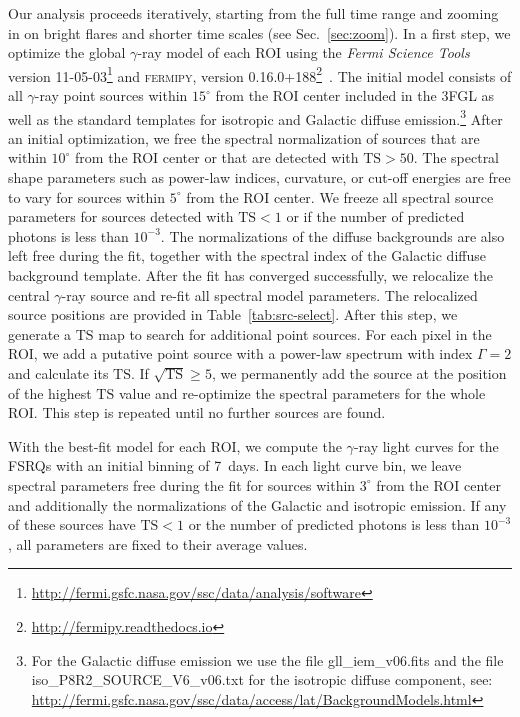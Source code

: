 \documentclass[twocolumn]{aastex62}
\newcommand{\gray}{$\gamma$-ray\xspace}
\begin{document}
Our analysis proceeds iteratively, starting from the full time range and zooming in on bright flares and shorter time scales (see Sec.~\ref{sec:zoom}).
In a first step, we optimize the global \gray model of each ROI using the \textit{Fermi Science Tools} version 11-05-03\footnote{\url{http://fermi.gsfc.nasa.gov/ssc/data/analysis/software}} and \textsc{fermipy}, version 0.16.0+188\footnote{\url{http://fermipy.readthedocs.io}}~\citep{fermipy}.
The initial model consists of all \gray point sources within $15^\circ$ from the ROI center included in the 3FGL as well as the standard templates for isotropic and Galactic diffuse emission.\footnote{For the Galactic diffuse emission we use the file gll\_iem\_v06.fits and the file iso\_P8R2\_SOURCE\_V6\_v06.txt for the isotropic diffuse component, see: \url{ http://fermi.gsfc.nasa.gov/ssc/data/access/lat/BackgroundModels.html}}
After an initial optimization, we free the spectral normalization of sources that are within $10^\circ$ from the ROI center or that are detected with $\mathrm{TS} > 50$.
The spectral shape parameters such as power-law indices, curvature, or cut-off energies are free to vary for sources within $5^\circ$ from the ROI center. 
We freeze all spectral source parameters for sources detected with $\mathrm{TS} < 1$ or if the number of predicted photons is less than $10^{-3}$.
The normalizations of the diffuse backgrounds are also left free during the fit, together with the spectral index of the Galactic diffuse background template.
After the fit has converged successfully, 
we relocalize the central \gray source and re-fit all spectral model parameters. The relocalized source positions are provided in Table~\ref{tab:src-select}.
After this step, we generate a $\mathrm{TS}$ map to search for additional point sources. For each pixel in the ROI, we add a putative point source with a power-law spectrum with index $\Gamma = 2$ and calculate its $\mathrm{TS}$. If  $\sqrt{\mathrm{TS}} \geqslant 5$, we permanently add the source at the position of the highest $\mathrm{TS}$ value and re-optimize the spectral parameters for the whole ROI. This step is repeated until no further sources are found.

With the best-fit model for each ROI, we compute the \gray light curves for the FSRQs with an initial binning of 7~days. 
In each light curve bin, we leave spectral parameters free during the fit for sources within $3^\circ$ from the ROI center and additionally the normalizations of the Galactic and isotropic emission. If any of these sources have $\mathrm{TS} < 1$ or the number of predicted photons is less than $10^{-3}$, all parameters are fixed to their average values.
\end{document}
